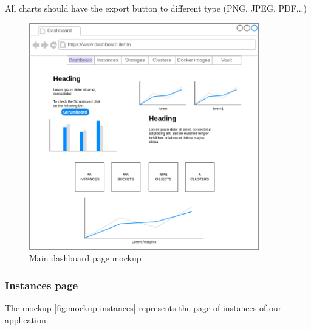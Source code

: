 All charts should have the export button to different type (PNG, JPEG, PDF,..)
\begin{figure}[h]
  \center
  \includegraphics[width=10cm]{mockup-dashboard.png}
  \caption{Main dashboard page mockup}
  \label{fig:mockup-dashboard}
\end{figure}
\vspace{50mm}

\subsubsection{Instances page}

The mockup \hyperref[fig:mockup-instances]{\ref{fig:mockup-instances}} represents the page of instances of our application.

